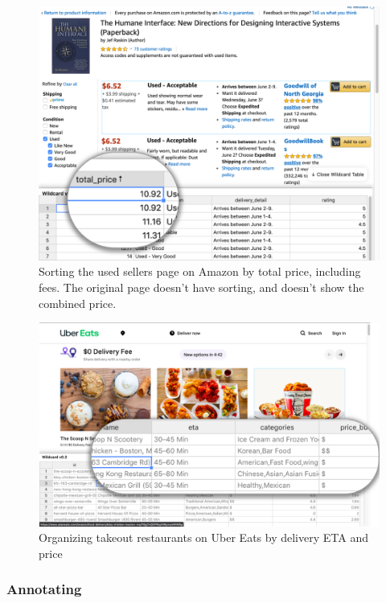 \documentclass[sigplan,screen,10pt,anonymous,review]{acmart}
\begin{document}
\begin{figure}
\hypertarget{fig:amazon}{%
\centering
\includegraphics[width=\columnwidth]{media/amazon.png}
\caption{Sorting the used sellers page on Amazon by total price, including fees. The original page doesn't have sorting, and doesn't show the combined price.}\label{fig:amazon}
}
\end{figure}

\begin{figure}
\hypertarget{fig:ubereats}{%
\centering
\includegraphics[width=\columnwidth]{media/ubereats.png}
\caption{Organizing takeout restaurants on Uber Eats by delivery ETA and price}\label{fig:ubereats}
}
\end{figure}

\hypertarget{annotating}{%
\subsubsection{Annotating}\label{annotating}}
\end{document}
